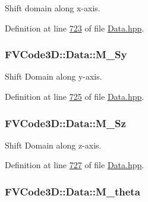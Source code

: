 Shift domain along x-\/axis. 



Definition at line \hyperlink{Data_8hpp_source_l00723}{723} of file \hyperlink{Data_8hpp_source}{Data.\+hpp}.

\subsubsection[{\texorpdfstring{M\+\_\+\+Sy}{M_Sy}}]{ F\+V\+Code3\+D\+::\+Data\+::\+M\+\_\+\+Sy\hspace{0.3cm}{\ttfamily [protected]}}\hypertarget{classFVCode3D_1_1Data_a4020737adfbc21dc3e5b682ac60692da}{}\label{classFVCode3D_1_1Data_a4020737adfbc21dc3e5b682ac60692da}


Shift Domain along y-\/axis. 



Definition at line \hyperlink{Data_8hpp_source_l00725}{725} of file \hyperlink{Data_8hpp_source}{Data.\+hpp}.

\subsubsection[{\texorpdfstring{M\+\_\+\+Sz}{M_Sz}}]{ F\+V\+Code3\+D\+::\+Data\+::\+M\+\_\+\+Sz\hspace{0.3cm}{\ttfamily [protected]}}\hypertarget{classFVCode3D_1_1Data_af6d969081d817b510c19401baa80593f}{}\label{classFVCode3D_1_1Data_af6d969081d817b510c19401baa80593f}


Shift Domain along z-\/axis. 



Definition at line \hyperlink{Data_8hpp_source_l00727}{727} of file \hyperlink{Data_8hpp_source}{Data.\+hpp}.

\subsubsection[{\texorpdfstring{M\+\_\+theta}{M_theta}}]{ F\+V\+Code3\+D\+::\+Data\+::\+M\+\_\+theta\hspace{0.3cm}{\ttfamily [protected]}}\hypertarget{classFVCode3D_1_1Data_a984e97d7d25e882ba1b089b3d82f78c3}{}\label{classFVCode3D_1_1Data_a984e97d7d25e882ba1b089b3d82f78c3}


